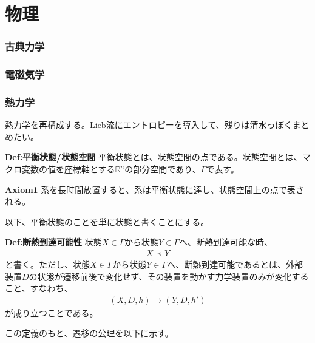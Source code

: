 \documentclass[a4paper,11pt]{jsarticle}
\numberwithin{equation}{section}
\begin{document}
\part{物理}
\section{古典力学}

\section{電磁気学}

\section{熱力学}
熱力学を再構成する。Lieb流にエントロピーを導入して、残りは清水っぽくまとめたい。\\

\begin{itembox}[l]{\textbf{Def:平衡状態/状態空間}}
  平衡状態とは、状態空間の点である。状態空間とは、マクロ変数の値を座標軸とする$\mathbb{R}^n$の部分空間であり、$\Gamma$で表す。
\end{itembox}

\begin{itembox}[l]{\textbf{Axiom1}}
  系を長時間放置すると、系は平衡状態に達し、状態空間上の点で表される。
\end{itembox}

以下、平衡状態のことを単に状態と書くことにする。\\

\begin{itembox}[l]{\textbf{Def:断熱到達可能性}}
  状態$X \in \Gamma$から状態$Y \in \Gamma$へ、断熱到達可能な時、
  \begin{align}
    X \prec Y
  \end{align}
  と書く。ただし、状態$X \in \Gamma$から状態$Y \in \Gamma$へ、断熱到達可能であるとは、外部装置$D$の状態が遷移前後で変化せず、その装置を動かす力学装置のみが変化すること、すなわち、
  \begin{align}
    (X , D , h) \rightarrow (Y , D , h')
  \end{align}
  が成り立つことである。

\end{itembox}
この定義のもと、遷移の公理を以下に示す。\\
\end{document}
